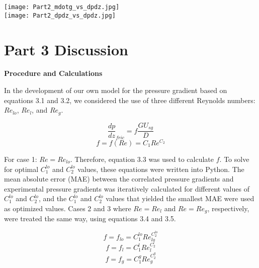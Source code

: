 \texttt{[image: Part2\_mdotg\_vs\_dpdz.jpg]}\\

\texttt{[image: Part2\_dpdz\_vs\_dpdz.jpg]}\\

\section{Part 3 Discussion}

\textbf{Procedure and Calculations}

In the development of our own model for the pressure gradient based on equations 3.1 and 3.2, we considered the use of three different Reynolds numbers: \(Re_{lo}\), \(Re_l\), and \(Re_g\). 

\begin{equation}
\frac{dp}{dz}_{fric}=f\frac{GU_{sg}}{D}
\end{equation}
\begin{equation}
f=f(Re)=C_1Re^{C_2}
\end{equation}

For case 1: \(Re=Re_{lo}\). Therefore, equation 3.3 was used to calculate \(f\). To solve for optimal \(C_1^{lo}\) and \(C_2^{lo}\) values, these equations were written into Python. The mean absolute error (MAE) between the correlated pressure gradients and experimental pressure gradients was iteratively calculated for different values of \(C_1^{lo}\) and \(C_2^{lo}\), and the \(C_1^{lo}\) and \(C_2^{lo}\) values that yielded the smallest MAE were used as optimized values. Cases 2 and 3 where \(Re=Re_l\) and \(Re=Re_g\), respectively, were treated the same way, using equations 3.4 and 3.5.

\begin{equation}
f=f_{lo} = C_1^{lo}Re_{lo}^{C_2^{lo}}
\end{equation}
\begin{equation}
f=f_l = C_1^lRe_l^{C_2^l}
\end{equation}
\begin{equation}
f=f_g = C_1^gRe_g^{C_2^g}
\end{equation}

